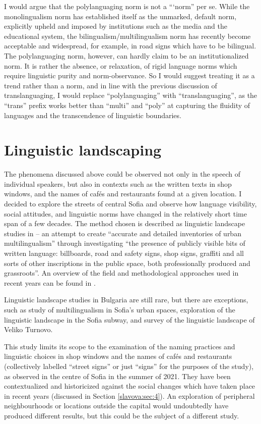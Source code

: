 \documentclass[output=paper]{langscibook}
\begin{document}
I would argue that the polylanguaging norm is not a ``‘norm'' per se. While the monolingualism norm has established itself as the unmarked, default norm, explicitly upheld and imposed by institutions such as the media and the educational system, the bilingualism/multilingualism norm has recently become acceptable and widespread, for example, in road signs which have to be bilingual. The polylanguaging norm, however, can hardly claim to be an institutionalized norm. It is rather the absence, or relaxation, of rigid language norms which require linguistic purity and norm-observance. So I would suggest treating it as a trend rather than a norm, and in line with the previous discussion of translanguaging, I would replace ``polylanguaging'' with ``translanguaging'', as the ``trans'' prefix works better than ``multi'' and ``poly'' at capturing the fluidity of languages and the transcendence of linguistic boundaries.

\section{Linguistic landscaping}
The phenomena discussed above could be observed not only in the speech of individual speakers, but also in contexts such as the written texts in shop windows, and the names of cafés and restaurants found at a given location. I decided to explore the streets of central Sofia and observe how language visibility, social attitudes, and linguistic norms have changed in the relatively short time span of a few decades. The method chosen is described as linguistic landscape studies in \citet[1]{BlommaertMaly.2014} – an attempt to create “accurate and detailed inventories of urban multilingualism” through investigating “the presence of publicly visible bits of written language: billboards, road and safety signs, shop signs, graffiti and all sorts of other inscriptions in the public space, both professionally produced and grassroots”. An overview of the field and methodological approaches used in recent years can be found in \citet{Gorter.2013}. 

Linguistic landscape studies in Bulgaria are still rare, but there are exceptions, such as  study of multilingualism in Sofia’s urban spaces,  exploration of the linguistic landscape in the Sofia subway, and  survey of the linguistic landscape of Veliko Turnovo. 

This study limits its scope to the examination of the naming practices and linguistic choices in shop windows and the names of cafés and restaurants (collectively labelled ``street signs'' or just ``signs'' for the purposes of the study), as observed in the centre of Sofia in the summer of 2021. They have been contextualized and historicized against the social changes which have taken place in recent years (discussed in Section \ref{slavova:sec:4}). An exploration of peripheral neighbourhoods or locations outside the capital would undoubtedly have produced different results, but this could be the subject of a different study.
\end{document}
